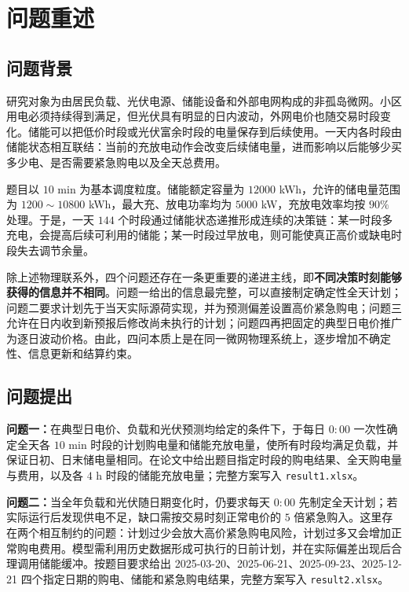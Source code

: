 \section{问题重述}

\subsection{问题背景}

研究对象为由居民负载、光伏电源、储能设备和外部电网构成的非孤岛微网。小区用电必须持续得到满足，但光伏具有明显的日内波动，外网电价也随交易时段变化。储能可以把低价时段或光伏富余时段的电量保存到后续使用。一天内各时段由储能状态相互联结：当前的充放电动作会改变后续储电量，进而影响以后能够少买多少电、是否需要紧急购电以及全天总费用。

题目以 $10$ min 为基本调度粒度。储能额定容量为 $12000$ kWh，允许的储电量范围为 $1200\sim10800$ kWh，最大充、放电功率均为 $5000$ kW，充放电效率均按 $90\%$ 处理。于是，一天 $144$ 个时段通过储能状态递推形成连续的决策链：某一时段多充电，会提高后续可利用的储能；某一时段过早放电，则可能使真正高价或缺电时段失去调节余量。

除上述物理联系外，四个问题还存在一条更重要的递进主线，即\textbf{不同决策时刻能够获得的信息并不相同}。问题一给出的信息最完整，可以直接制定确定性全天计划；问题二要求计划先于当天实际源荷实现，并为预测偏差设置高价紧急购电；问题三允许在日内收到新预报后修改尚未执行的计划；问题四再把固定的典型日电价推广为逐日波动价格。由此，四问本质上是在同一微网物理系统上，逐步增加不确定性、信息更新和结算约束。

\subsection{问题提出}

\indent\textbf{问题一：}在典型日电价、负载和光伏预测均给定的条件下，于每日 $0{:}00$ 一次性确定全天各 $10$ min 时段的计划购电量和储能充放电量，使所有时段均满足负载，并保证日初、日末储电量相同。在论文中给出题目指定时段的购电结果、全天购电量与费用，以及各 $4$ h 时段的储能充放电量；完整方案写入 \texttt{result1.xlsx}。

\indent\textbf{问题二：}当全年负载和光伏随日期变化时，仍要求每天 $0{:}00$ 先制定全天计划；若实际运行后发现供电不足，缺口需按交易时刻正常电价的 $5$ 倍紧急购入。这里存在两个相互制约的问题：计划过少会放大高价紧急购电风险，计划过多又会增加正常购电费用。模型需利用历史数据形成可执行的日前计划，并在实际偏差出现后合理调用储能缓冲。按题目要求给出 2025-03-20、2025-06-21、2025-09-23、2025-12-21 四个指定日期的购电、储能和紧急购电结果，完整方案写入 \texttt{result2.xlsx}。


